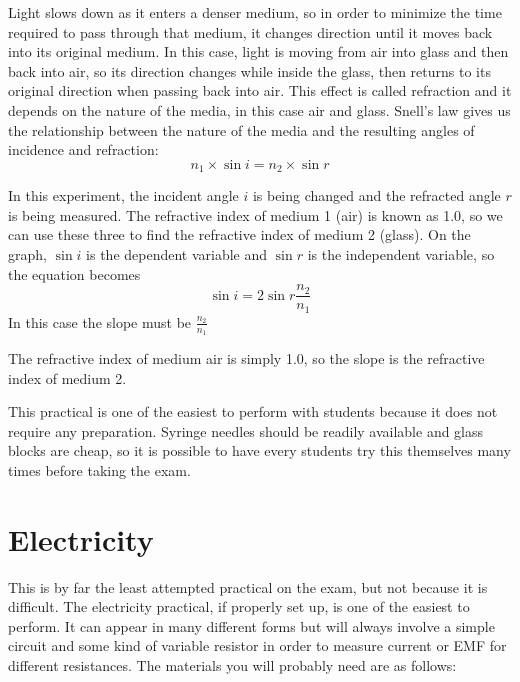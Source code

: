 Light slows down as it enters a denser medium, so in order to minimize the time
required to pass through that medium, it changes direction until it moves back into its
original medium. In this case, light is moving from air into glass and then back into air,
so its direction changes while inside the glass, then returns to its original direction when
passing back into air. This effect is called refraction and it depends on the nature of the
media, in this case air and glass. Snell’s law gives us the relationship between the nature
of the media and the resulting angles of incidence and refraction:
$$n_1 \times \sin{i} = n_2 \times \sin{r}$$

In this experiment, the incident angle $i$ is being changed and the refracted angle $r$
is being measured. The refractive index of medium 1 (air) is known as 1.0, so we can use
these three to find the refractive index of medium 2 (glass). On the graph, $\sin{i}$ is the
dependent variable and $\sin{r}$ is the independent variable, so the equation becomes
$$\sin{i} = 2 \sin{r} \frac{n_2}{n_1}$$
In this case the slope must be $\frac{n_2}{n_1}$

The refractive index of medium air is simply 1.0, so the slope is the refractive index of
medium 2.

This practical is one of the easiest to perform with students because it does not
require any preparation. Syringe needles should be readily available and glass blocks are
cheap, so it is possible to have every students try this themselves many times before
taking the exam.

\section{Electricity}

This is by far the least attempted practical on the exam, but not because it is
difficult. The electricity practical, if properly set up, is one of the easiest to perform. It
can appear in many different forms but will always involve a simple circuit and some
kind of variable resistor in order to measure current or EMF for different resistances. The
materials you will probably need are as follows:


